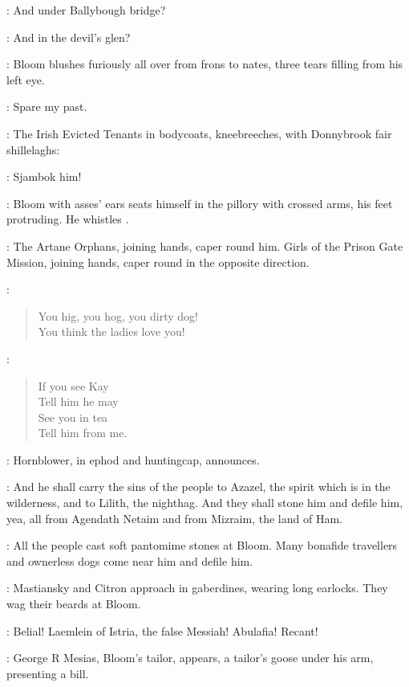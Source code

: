 \FemaleInfant:
And under Ballybough bridge?

\Hollybush:
And in the devil's glen?

:
Bloom blushes furiously all over from frons to nates,
three tears filling from his left eye.

\Bloom:
Spare my past.

:
The Irish Evicted Tenants in bodycoats,
kneebreeches,
with Donnybrook fair shillelaghs:

\EvictedTenants:
Sjambok him!

:
Bloom with asses' ears seats himself in the pillory with crossed arms,
his feet protruding.
He whistles .

:
The Artane Orphans,
joining hands,
caper round him.
Girls of the Prison Gate Mission,
joining hands,
caper round in the opposite direction.

\ArtaneOrphans:
\begin{verse}
%
    You hig,
you hog,
you dirty dog!\\
    You think the ladies love you!
\end{verse}

\PrisonGateGirls[1]:
\begin{verse}
    If you see Kay\\
    Tell him he may\\
    See you in tea\\
    Tell him from me.
\end{verse}

:
Hornblower,
in ephod and huntingcap,
announces.

\Hornblower:
And he shall carry the sins of the people to Azazel,
the spirit which is in the wilderness,
and to Lilith,
the nighthag.
And they shall stone him and defile him,
yea,
all from Agendath Netaim and from Mizraim,
the land of Ham.

:
All the people cast soft pantomime stones at Bloom.
Many bonafide travellers and ownerless dogs come near him and defile him.

:
Mastiansky and Citron approach in gaberdines,
wearing long earlocks.
They wag their beards at Bloom.

\MastianskyCitron:
Belial!
Laemlein of Istria,
the false Messiah!
Abulafia!
Recant!

:
George R Mesias,
Bloom's tailor,
appears,
a tailor's goose under his arm,
presenting a bill.

